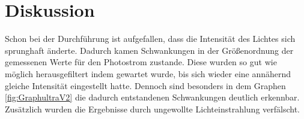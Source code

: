 
\section{Diskussion}
\label{sec:Diskussion}

Schon bei der Durchführung ist aufgefallen, dass die Intensität des Lichtes sich sprunghaft änderte. Dadurch kamen Schwankungen in der Größenordnung der gemessenen Werte für den Photostrom zustande. Diese wurden so gut wie möglich herausgefiltert indem gewartet wurde, bis sich wieder eine annähernd gleiche Intensität eingestellt hatte. Dennoch sind besonders in dem Graphen \ref{fig:GraphultraV2} die dadurch entstandenen Schwankungen deutlich erkennbar. Zusätzlich wurden die Ergebnisse durch ungewollte Lichteinstrahlung verfälscht. 

